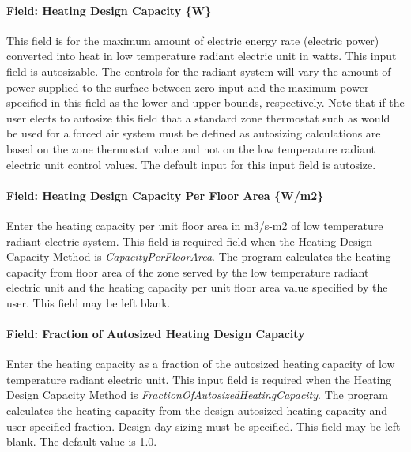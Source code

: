 \paragraph{Field: Heating Design Capacity \{W\}}\label{field-heating-design-capacity-w-6}

This field is for the maximum amount of electric energy rate (electric power) converted into heat in low temperature radiant electric unit in watts. This input field is autosizable. The controls for the radiant system will vary the amount of power supplied to the surface between zero input and the maximum power specified in this field as the lower and upper bounds, respectively. Note that if the user elects to autosize this field that a standard zone thermostat such as would be used for a forced air system must be defined as autosizing calculations are based on the zone thermostat value and not on the low temperature radiant electric unit control values. The default input for this input field is autosize.

\paragraph{Field: Heating Design Capacity Per Floor Area \{W/m2\}}\label{field-heating-design-capacity-per-floor-area-wm2-6}

Enter the heating capacity per unit floor area in m3/s-m2 of low temperature radiant electric system. This field is required field when the Heating Design Capacity Method is \emph{CapacityPerFloorArea}. The program calculates the heating capacity from floor area of the zone served by the low temperature radiant electric unit and the heating capacity per unit floor area value specified by the user. This field may be left blank.

\paragraph{Field: Fraction of Autosized Heating Design Capacity}\label{field-fraction-of-autosized-heating-design-capacity-6}

Enter the heating capacity as a fraction of the autosized heating capacity of low temperature radiant electric unit. This input field is required when the Heating Design Capacity Method is \emph{FractionOfAutosizedHeatingCapacity}. The program calculates the heating capacity from the design autosized heating capacity and user specified fraction. Design day sizing must be specified. This field may be left blank. The default value is 1.0.

